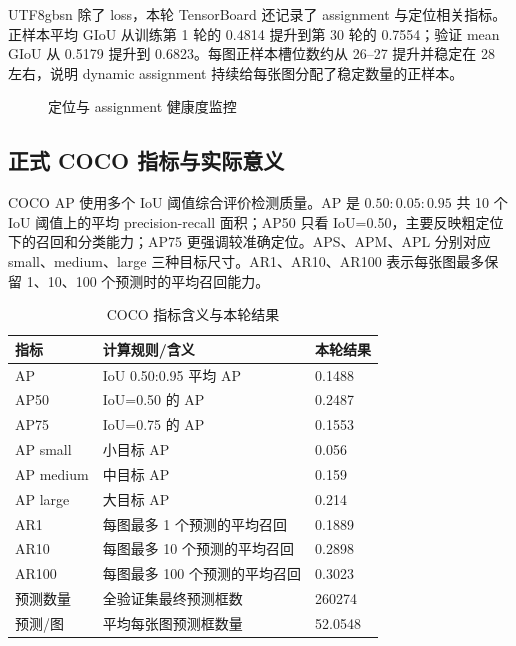 \documentclass[11pt,a4paper]{article}
\begin{document}
\begin{CJK*}{UTF8}{gbsn}
除了 loss，本轮 TensorBoard 还记录了 assignment 与定位相关指标。正样本平均 GIoU 从训练第 1 轮的 0.4814 提升到第 30 轮的 0.7554；验证 mean GIoU 从 0.5179 提升到 0.6823。每图正样本槽位数约从 26--27 提升并稳定在 28 左右，说明 dynamic assignment 持续给每张图分配了稳定数量的正样本。

\begin{figure}[H]
\centering
{}
\caption{定位与 assignment 健康度监控}
\end{figure}

\subsection{正式 COCO 指标与实际意义}

COCO AP 使用多个 IoU 阈值综合评价检测质量。AP 是 $0.50:0.05:0.95$ 共 10 个 IoU 阈值上的平均 precision-recall 面积；AP50 只看 IoU=0.50，主要反映粗定位下的召回和分类能力；AP75 更强调较准确定位。APS、APM、APL 分别对应 small、medium、large 三种目标尺寸。AR1、AR10、AR100 表示每张图最多保留 1、10、100 个预测时的平均召回能力。

\begin{table}[H]
\centering
\caption{COCO 指标含义与本轮结果}
\begin{tabular}{lll}
\toprule
指标 & 计算规则/含义 & 本轮结果 \\
\midrule
AP & IoU 0.50:0.95 平均 AP & 0.1488 \\
AP50 & IoU=0.50 的 AP & 0.2487 \\
AP75 & IoU=0.75 的 AP & 0.1553 \\
AP small & 小目标 AP & 0.056 \\
AP medium & 中目标 AP & 0.159 \\
AP large & 大目标 AP & 0.214 \\
AR1 & 每图最多 1 个预测的平均召回 & 0.1889 \\
AR10 & 每图最多 10 个预测的平均召回 & 0.2898 \\
AR100 & 每图最多 100 个预测的平均召回 & 0.3023 \\
预测数量 & 全验证集最终预测框数 & 260274 \\
预测/图 & 平均每张图预测框数量 & 52.0548 \\
\bottomrule
\end{tabular}
\end{table}


\end{CJK*}
\end{document}
